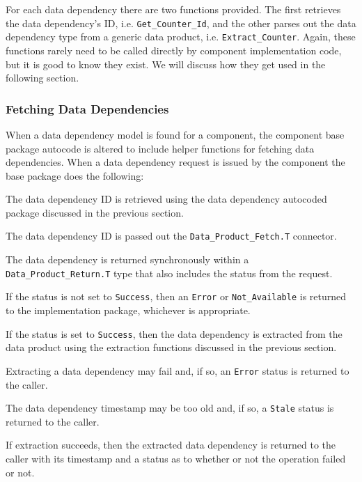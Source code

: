 For each data dependency there are two functions provided. The first retrieves the data dependency's ID, i.e. \texttt{Get\_Counter\_Id}, and the other parses out the data dependency type from a generic data product, i.e. \texttt{Extract\_Counter}. Again, these functions rarely need to be called directly by component implementation code, but it is good to know they exist. We will discuss how they get used in the following section.

\subsubsection{Fetching Data Dependencies}

When a data dependency model is found for a component, the component base package autocode is altered to include helper functions for fetching data dependencies. When a data dependency request is issued by the component the base package does the following:

\vspace{5mm} %
\begin{spacedenumerate}
  \item The data dependency ID is retrieved using the data dependency autocoded package discussed in the previous section.
  \item The data dependency ID is passed out the \texttt{Data\_Product\_Fetch.T} connector.
  \item The data dependency is returned synchronously within a \texttt{Data\_Product\_Return.T} type that also includes the status from the request.
  \item If the status is not set to \texttt{Success}, then an \texttt{Error} or \texttt{Not\_Available} is returned to the implementation package, whichever is appropriate.
  \item If the status is set to \texttt{Success}, then the data dependency is extracted from the data product using the extraction functions discussed in the previous section.
  \item Extracting a data dependency may fail and, if so, an \texttt{Error} status is returned to the caller.
  \item The data dependency timestamp may be too old and, if so, a \texttt{Stale} status is returned to the caller.
  \item If extraction succeeds, then the extracted data dependency is returned to the caller with its timestamp and a status as to whether or not the operation failed or not.
\end{spacedenumerate}
\vspace{5mm} %

